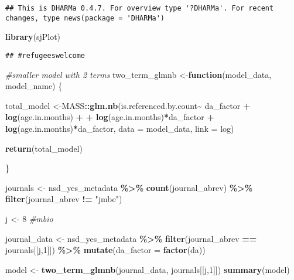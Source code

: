 \documentclass[
]{article}
\newenvironment{Shaded}{\begin{snugshade}}{\end{snugshade}}
\newcommand{\AttributeTok}[1]{\textcolor[rgb]{0.13,0.29,0.53}{#1}}
\newcommand{\CommentTok}[1]{\textcolor[rgb]{0.56,0.35,0.01}{\textit{#1}}}
\newcommand{\ControlFlowTok}[1]{\textcolor[rgb]{0.13,0.29,0.53}{\textbf{#1}}}
\newcommand{\DecValTok}[1]{\textcolor[rgb]{0.00,0.00,0.81}{#1}}
\newcommand{\FunctionTok}[1]{\textcolor[rgb]{0.13,0.29,0.53}{\textbf{#1}}}
\newcommand{\NormalTok}[1]{#1}
\newcommand{\OtherTok}[1]{\textcolor[rgb]{0.56,0.35,0.01}{#1}}
\newcommand{\SpecialCharTok}[1]{\textcolor[rgb]{0.81,0.36,0.00}{\textbf{#1}}}
\newcommand{\StringTok}[1]{\textcolor[rgb]{0.31,0.60,0.02}{#1}}
\begin{document}
\begin{verbatim}
## This is DHARMa 0.4.7. For overview type '?DHARMa'. For recent changes, type news(package = 'DHARMa')
\end{verbatim}

\begin{Shaded}
\begin{Highlighting}[]
\FunctionTok{library}\NormalTok{(sjPlot)}
\end{Highlighting}
\end{Shaded}

\begin{verbatim}
## #refugeeswelcome
\end{verbatim}

\begin{Shaded}
\begin{Highlighting}[]
\CommentTok{\#smaller model with 2 terms}
\NormalTok{two\_term\_glmnb }\OtherTok{\textless{}{-}}\ControlFlowTok{function}\NormalTok{(model\_data, model\_name) \{}

\NormalTok{  total\_model }\OtherTok{\textless{}{-}}\NormalTok{MASS}\SpecialCharTok{::}\FunctionTok{glm.nb}\NormalTok{(is.referenced.by.count}\SpecialCharTok{\textasciitilde{}}\NormalTok{ da\_factor }\SpecialCharTok{+} \FunctionTok{log}\NormalTok{(age.in.months) }\SpecialCharTok{+} 
       \SpecialCharTok{+} \FunctionTok{log}\NormalTok{(age.in.months)}\SpecialCharTok{*}\NormalTok{da\_factor }\SpecialCharTok{+} \FunctionTok{log}\NormalTok{(age.in.months)}\SpecialCharTok{*}\NormalTok{da\_factor, }\AttributeTok{data =}\NormalTok{ model\_data, }\AttributeTok{link =}\NormalTok{ log)}

  \FunctionTok{return}\NormalTok{(total\_model)}
 
\NormalTok{\}}

\NormalTok{journals }\OtherTok{\textless{}{-}} 
\NormalTok{  nsd\_yes\_metadata }\SpecialCharTok{\%\textgreater{}\%}  
  \FunctionTok{count}\NormalTok{(journal\_abrev) }\SpecialCharTok{\%\textgreater{}\%}  
  \FunctionTok{filter}\NormalTok{(journal\_abrev }\SpecialCharTok{!=} \StringTok{"jmbe"}\NormalTok{) }

\NormalTok{j }\OtherTok{\textless{}{-}} \DecValTok{8} \CommentTok{\#mbio}


\NormalTok{  journal\_data }\OtherTok{\textless{}{-}} 
\NormalTok{  nsd\_yes\_metadata }\SpecialCharTok{\%\textgreater{}\%} 
    \FunctionTok{filter}\NormalTok{(journal\_abrev }\SpecialCharTok{==}\NormalTok{ journals[[j,}\DecValTok{1}\NormalTok{]]) }\SpecialCharTok{\%\textgreater{}\%}  
    \FunctionTok{mutate}\NormalTok{(}\AttributeTok{da\_factor =} \FunctionTok{factor}\NormalTok{(da))}
  

\NormalTok{  model }\OtherTok{\textless{}{-}} \FunctionTok{two\_term\_glmnb}\NormalTok{(journal\_data, journals[[j,}\DecValTok{1}\NormalTok{]])}
\FunctionTok{summary}\NormalTok{(model)}
\end{Highlighting}
\end{Shaded}
\end{document}
